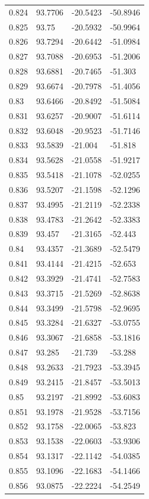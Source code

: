 \begin{tabular}{llll}
0.824 & 93.7706 & -20.5423 & -50.8946 \\
0.825 & 93.75 & -20.5932 & -50.9964 \\
0.826 & 93.7294 & -20.6442 & -51.0984 \\
0.827 & 93.7088 & -20.6953 & -51.2006 \\
0.828 & 93.6881 & -20.7465 & -51.303 \\
0.829 & 93.6674 & -20.7978 & -51.4056 \\
0.83 & 93.6466 & -20.8492 & -51.5084 \\
0.831 & 93.6257 & -20.9007 & -51.6114 \\
0.832 & 93.6048 & -20.9523 & -51.7146 \\
0.833 & 93.5839 & -21.004 & -51.818 \\
0.834 & 93.5628 & -21.0558 & -51.9217 \\
0.835 & 93.5418 & -21.1078 & -52.0255 \\
0.836 & 93.5207 & -21.1598 & -52.1296 \\
0.837 & 93.4995 & -21.2119 & -52.2338 \\
0.838 & 93.4783 & -21.2642 & -52.3383 \\
0.839 & 93.457 & -21.3165 & -52.443 \\
0.84 & 93.4357 & -21.3689 & -52.5479 \\
0.841 & 93.4144 & -21.4215 & -52.653 \\
0.842 & 93.3929 & -21.4741 & -52.7583 \\
0.843 & 93.3715 & -21.5269 & -52.8638 \\
0.844 & 93.3499 & -21.5798 & -52.9695 \\
0.845 & 93.3284 & -21.6327 & -53.0755 \\
0.846 & 93.3067 & -21.6858 & -53.1816 \\
0.847 & 93.285 & -21.739 & -53.288 \\
0.848 & 93.2633 & -21.7923 & -53.3945 \\
0.849 & 93.2415 & -21.8457 & -53.5013 \\
0.85 & 93.2197 & -21.8992 & -53.6083 \\
0.851 & 93.1978 & -21.9528 & -53.7156 \\
0.852 & 93.1758 & -22.0065 & -53.823 \\
0.853 & 93.1538 & -22.0603 & -53.9306 \\
0.854 & 93.1317 & -22.1142 & -54.0385 \\
0.855 & 93.1096 & -22.1683 & -54.1466 \\
0.856 & 93.0875 & -22.2224 & -54.2549 \\

\end{tabular}
